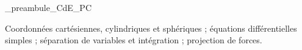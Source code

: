 



\ifdefined\mainIsLoaded\else
\RequirePackage{import}
{_preambule_CdE_PC}

\fi







\debutFicheEntrainement                                                                      %




\begin{prerequis}
Coordonnées cartésiennes, cylindriques et sphériques ; équations différentielles simples ; séparation de variables et intégration ; projection de forces.
\end{prerequis}






